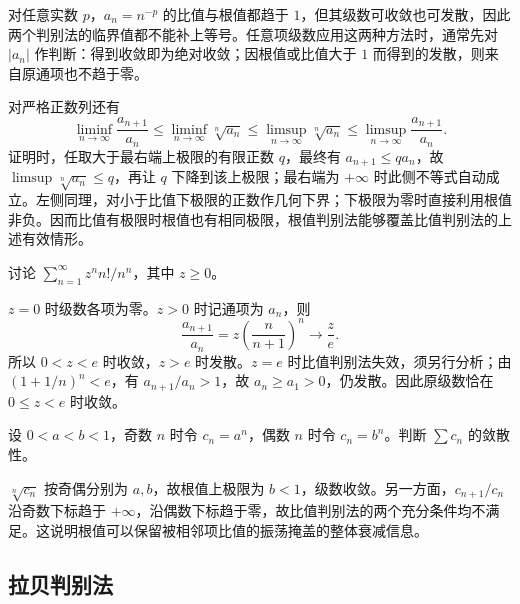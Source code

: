 对任意实数 $p$，$a_n=n^{-p}$ 的比值与根值都趋于 $1$，但其级数可收敛也可发散，因此两个判别法的临界值都不能补上等号。任意项级数应用这两种方法时，通常先对 $|a_n|$ 作判断：得到收敛即为绝对收敛；因根值或比值大于 $1$ 而得到的发散，则来自原通项也不趋于零。

对严格正数列还有
\begin{equation}
    \liminf_{n\to\infty}\frac{a_{n+1}}{a_n}
    \leq\liminf_{n\to\infty}\sqrt[n]{a_n}
    \leq\limsup_{n\to\infty}\sqrt[n]{a_n}
    \leq\limsup_{n\to\infty}\frac{a_{n+1}}{a_n}.
    \label{eq:series-ratio-root-limits}
\end{equation}
证明时，任取大于最右端上极限的有限正数 $q$，最终有 $a_{n+1}\leq qa_n$，故 $\limsup\sqrt[n]{a_n}\leq q$，再让 $q$ 下降到该上极限；最右端为 $+\infty$ 时此侧不等式自动成立。左侧同理，对小于比值下极限的正数作几何下界；下极限为零时直接利用根值非负。因而比值有极限时根值也有相同极限，根值判别法能够覆盖比值判别法的上述有效情形。

\begin{example}
\label{ex:factorial-power-ratio-test}
讨论 $\sum_{n=1}^{\infty}z^nn!/n^n$，其中 $z\geq0$。
\end{example}

\begin{solve}
$z=0$ 时级数各项为零。$z>0$ 时记通项为 $a_n$，则
\[
    \frac{a_{n+1}}{a_n}=z\left(\frac n{n+1}\right)^n\longrightarrow\frac ze.
\]
所以 $0<z<e$ 时收敛，$z>e$ 时发散。$z=e$ 时比值判别法失效，须另行分析；由 $(1+1/n)^n<e$，有 $a_{n+1}/a_n>1$，故 $a_n\geq a_1>0$，仍发散。因此原级数恰在 $0\leq z<e$ 时收敛。
\end{solve}

\begin{example}
\label{ex:root-test-with-oscillating-ratios}
设 $0<a<b<1$，奇数 $n$ 时令 $c_n=a^n$，偶数 $n$ 时令 $c_n=b^n$。判断 $\sum c_n$ 的敛散性。
\end{example}

\begin{solve}
$\sqrt[n]{c_n}$ 按奇偶分别为 $a,b$，故根值上极限为 $b<1$，级数收敛。另一方面，$c_{n+1}/c_n$ 沿奇数下标趋于 $+\infty$，沿偶数下标趋于零，故比值判别法的两个充分条件均不满足。这说明根值可以保留被相邻项比值的振荡掩盖的整体衰减信息。
\end{solve}

\subsection{拉贝判别法}
\label{subsec:raabe-test}

